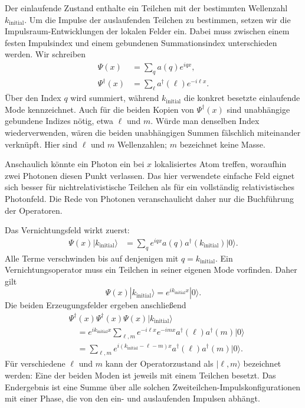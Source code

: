Der einlaufende Zustand enthalte ein Teilchen mit der bestimmten Wellenzahl \(k_{\mathrm{initial}}\). Um die Impulse der auslaufenden Teilchen zu bestimmen, setzen wir die Impulsraum-Entwicklungen der lokalen Felder ein. Dabei muss zwischen einem festen Impulsindex und einem gebundenen Summationsindex unterschieden werden. Wir schreiben
\begin{align}
\Psi(x)&=\sum_q a(q)e^{iqx},\\
\Psi^\dagger(x)&=\sum_\ell a^\dagger(\ell)e^{-i\ell x}.
\end{align}
Über den Index \(q\) wird summiert, während \(k_{\mathrm{initial}}\) die konkret besetzte einlaufende Mode kennzeichnet. Auch für die beiden Kopien von \(\Psi^\dagger(x)\) sind unabhängige gebundene Indizes nötig, etwa \(\ell\) und \(m\). Würde man denselben Index wiederverwenden, wären die beiden unabhängigen Summen fälschlich miteinander verknüpft. Hier sind \(\ell\) und \(m\) Wellenzahlen; \(m\) bezeichnet keine Masse.

Anschaulich könnte ein Photon ein bei \(x\) lokalisiertes Atom treffen, woraufhin zwei Photonen diesen Punkt verlassen. Das hier verwendete einfache Feld eignet sich besser für nichtrelativistische Teilchen als für ein vollständig relativistisches Photonfeld. Die Rede von Photonen veranschaulicht daher nur die Buchführung der Operatoren.

Das Vernichtungsfeld wirkt zuerst:
\begin{align}
\Psi(x)|k_{\mathrm{initial}}\rangle
&=\sum_q e^{iqx}a(q)a^\dagger(k_{\mathrm{initial}})|0\rangle.
\end{align}
Alle Terme verschwinden bis auf denjenigen mit \(q=k_{\mathrm{initial}}\). Ein Vernichtungsoperator muss ein Teilchen in seiner eigenen Mode vorfinden. Daher gilt
\begin{equation}
\Psi(x)|k_{\mathrm{initial}}\rangle
=e^{ik_{\mathrm{initial}}x}|0\rangle.
\end{equation}
Die beiden Erzeugungsfelder ergeben anschließend
\begin{align}
&\Psi^\dagger(x)\Psi^\dagger(x)\Psi(x)
|k_{\mathrm{initial}}\rangle
\\
&\quad=
e^{ik_{\mathrm{initial}}x}
\sum_{\ell,m}
e^{-i\ell x}e^{-imx}
a^\dagger(\ell)a^\dagger(m)|0\rangle
\\
&\quad=
\sum_{\ell,m}
e^{i(k_{\mathrm{initial}}-\ell-m)x}
a^\dagger(\ell)a^\dagger(m)|0\rangle.
\end{align}
Für verschiedene \(\ell\) und \(m\) kann der Operatorzustand als \(|\ell,m\rangle\) bezeichnet werden: Eine der beiden Moden ist jeweils mit einem Teilchen besetzt. Das Endergebnis ist eine Summe über alle solchen Zweiteilchen-Impulskonfigurationen mit einer Phase, die von den ein- und auslaufenden Impulsen abhängt.

